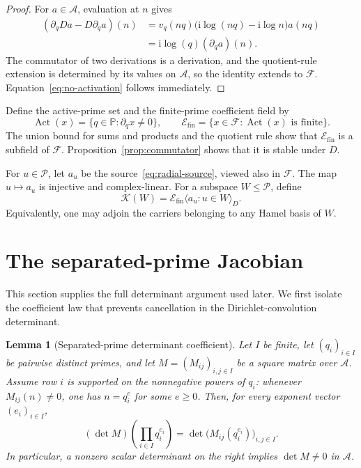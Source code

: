 \documentclass[11pt]{article}
\newtheorem{lemma}[theorem]{Lemma}
\theoremstyle{definition}
\theoremstyle{remark}
\newcommand{\PP}{\mathbb P}
\newcommand{\A}{\mathcal A}
\newcommand{\F}{\mathcal F}
\newcommand{\Efin}{\mathcal E_{\mathrm{fin}}}
\newcommand{\Pcal}{\mathcal P}
\newcommand{\K}{\mathcal K}
\begin{document}
\begin{proof}
For $a\in\A$, evaluation at $n$ gives
\begin{align*}
 (\partial_qDa-D\partial_qa)(n)
 &=v_q(nq)\bigl(\mathrm i\log(nq)-\mathrm i\log n\bigr)a(nq)\\
 &=\mathrm i\log(q)(\partial_qa)(n).
\end{align*}
The commutator of two derivations is a derivation, and the quotient-rule extension is determined by
its values on $\A$, so the identity extends to $\F$.  Equation~\eqref{eq:no-activation} follows
immediately.
\end{proof}

Define the active-prime set and the finite-prime coefficient field by
\begin{equation}\label{eq:Efin}
 \operatorname{Act}(x)=\{q\in\PP:\partial_qx\ne0\},
 \qquad
 \Efin=\{x\in\F:\operatorname{Act}(x)\text{ is finite}\}.
\end{equation}
The union bound for sums and products and the quotient rule show that $\Efin$ is a subfield of
$\F$.  Proposition~\ref{prop:commutator} shows that it is stable under $D$.

For $u\in\Pcal$, let $a_u$ be the source~\eqref{eq:radial-source}, viewed also in $\F$.  The map
$u\mapsto a_u$ is injective and complex-linear.  For a subspace $W\le\Pcal$, define
\begin{equation}\label{eq:KW}
 \K(W)=\Efin\langle a_u:u\in W\rangle_D.
\end{equation}
Equivalently, one may adjoin the carriers belonging to any Hamel basis of $W$.

\section{The separated-prime Jacobian}\label{sec:jacobian}

This section supplies the full determinant argument used later.  We first isolate the coefficient
law that prevents cancellation in the Dirichlet-convolution determinant.

\begin{lemma}[Separated-prime determinant coefficient]\label{lem:separated-coefficient}
Let $I$ be finite, let $(q_i)_{i\in I}$ be pairwise distinct primes, and let
$M=(M_{ij})_{i,j\in I}$ be a square matrix over $\A$.  Assume row $i$ is supported on the
nonnegative powers of $q_i$: whenever $M_{ij}(n)\ne0$, one has $n=q_i^e$ for some $e\ge0$.
Then, for every exponent vector $(e_i)_{i\in I}$,
\begin{equation}\label{eq:separated-det-coeff}
 (\det M)\!\left(\prod_{i\in I}q_i^{e_i}\right)
 =\det\bigl(M_{ij}(q_i^{e_i})\bigr)_{i,j\in I}.
\end{equation}
In particular, a nonzero scalar determinant on the right implies $\det M\ne0$ in $\A$.
\end{lemma}
\end{document}
